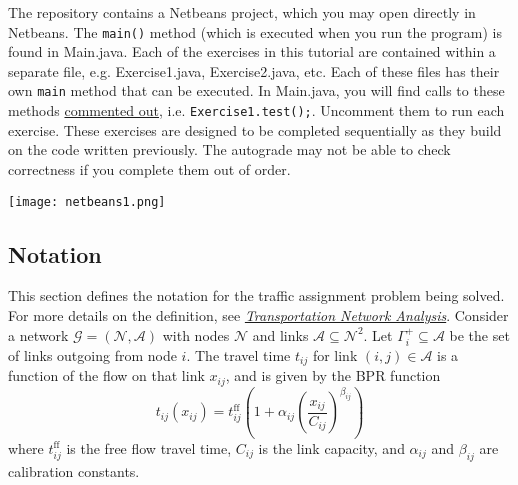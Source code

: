 \documentclass[11pt]{article}
\newcommand{\N}{\mathcal{N}}
\newcommand{\A}{\mathcal{A}}
\newcommand{\tff}{t^{\mathrm{ff}}_{ij}}
\begin{document}
The repository contains a Netbeans project, which you may open directly in Netbeans. 
The \texttt{main()} method (which is executed when you run the program) is found in Main.java. Each of the exercises in this tutorial are contained within a separate file, e.g. Exercise1.java, Exercise2.java, etc. Each of these files has their own \texttt{main} method that can be executed. 
In Main.java, you will find calls to these methods \href{https://www.w3schools.com/java/java_comments.asp}{commented out}, i.e. \texttt{Exercise1.test();}. Uncomment them to run each exercise. 
These exercises are designed to be completed sequentially as they build on the code written previously. The autograde may not be able to check correctness if you complete them out of order. 

\begin{center}
\texttt{[image: netbeans1.png]}
\end{center}




\subsection{Notation}

This section defines the notation for the traffic assignment problem being solved. 
For more details on the definition, see \href{https://sboyles.github.io/blubook.html}{\textit{Transportation Network Analysis}}. 
Consider a network $\mathcal{G}=(\N,\A)$ with nodes $\N$ and links $\A\subseteq \N^2$.  Let $\Gamma^+_i\subseteq\A$ be the set of links outgoing from node $i$. The travel time $t_{ij}$ for link $(i,j)\in\A$ is a function of the flow on that link $x_{ij}$, and is given by the BPR function
\begin{equation}
	t_{ij}(x_{ij}) = \tff \left(1+\alpha_{ij} \left(\frac{x_{ij}}{C_{ij}}\right)^{\beta_{ij}}\right) \label{bpr}
\end{equation}
where $\tff$ is the free flow travel time, $C_{ij}$ is the link capacity, and $\alpha_{ij}$ and $\beta_{ij}$ are calibration constants.
\end{document}
